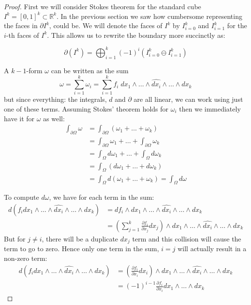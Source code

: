 \begin{proof}

First we will consider Stokes theorem for the standard cube $I^k = [0,1]^k \subset \mathbb{R}^k$.
In the previous section we saw how cumbersome representing the faces in $\partial I^k$, could be.
We will denote the faces of $I^k$ by $I^k_{i=0}$ and $I^k_{i=1}$ for the $i$-th faces of $I^k$.
This allows us to rewrite the boundary more succinctly as:


\begin{equation}
	\partial (I^k) = \bigoplus_{i=1}^k (-1)^i \left( I^k_{i=0} \ominus I^k_{i=1} \right) 
\end{equation}



A $k-1$-form $\omega$ can be written as the sum
\begin{equation}
	\omega 
		= \sum_{i=1}^k \omega_i 
		= \sum_{i=1}^k f_i \; dx_1 \wedge \ldots \wedge \widehat{dx_i} \wedge  \ldots \wedge dx_k
\end{equation}
but since everything: the integrals, $d$ and $\partial$ are all linear, we can work using just one of these terms.
Assuming Stokes' theorem holds for $\omega_i$ then we immediately have it for $\omega$ as well:
\begin{align*}
	\int_{\partial\Omega} \omega 
	&= \int_{\partial \Omega} (\omega_1 + \ldots + \omega_k) \\
	&= \int_{\partial\Omega} \omega_1 + \ldots + \int_{\partial\Omega} \omega_k  \\
	&= \int_{\Omega} d\omega_1 + \ldots + \int_\Omega d\omega_k \\
	&= \int_\Omega (d\omega_1 + \ldots + d\omega_k)\\
	&= \int_\Omega d(\omega_1 + \ldots + \omega_k) = \int_\Omega d\omega
\end{align*}



To compute $d\omega$, we have for each term in the sum:
\begin{align*}
	d \left( f_i dx_1 \wedge \ldots \wedge \widehat{dx_i} \wedge  \ldots \wedge dx_k \right) 
 		&= df_i \wedge dx_1 \wedge \ldots \wedge \widehat{dx_i} \wedge  \ldots \wedge dx_k \\ 
 		&= \left( \sum_{j=1}^k \frac{\partial f_i}{\partial x_j} dx_j \right)
 			\wedge dx_1 \wedge \ldots \wedge \widehat{dx_i} \wedge  \ldots \wedge dx_k
\end{align*}
But for $j \neq i$, there will be a duplicate $dx_j$ term and this collision will cause the term to go to zero.
Hence only one term in the sum, $i=j$ will actually result in a non-zero term:
\begin{align*}
	d \left( f_i dx_1 \wedge \ldots \wedge \widehat{dx_i} \wedge  \ldots \wedge dx_k \right) 
 		&= \left(\frac{\partial f_i}{\partial x_i} dx_i \right)
 			\wedge dx_1 \wedge \ldots \wedge \hat{dx_i} \wedge  \ldots \wedge dx_k \\ 
		&= (-1)^{i-1} \frac{\partial f_i}{\partial x_i}
 			 dx_1 \wedge \ldots \wedge dx_k
\end{align*}




\end{proof}
